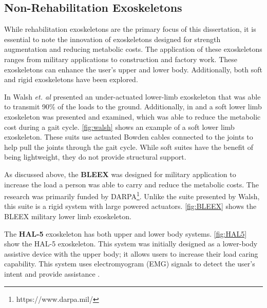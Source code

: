 \subsection{Non-Rehabilitation Exoskeletons}

While rehabilitation exoskeletons are the primary focus of this dissertation, it is essential to note the innovation of exoskeletons designed for strength augmentation and reducing metabolic costs. The application of these exoskeletons ranges from military applications to construction and factory work. These exoskeletons can enhance the user's upper and lower body. Additionally, both soft and rigid exoskeletons have been explored.

In \cite{walsh2006autonomous} Walsh \textit{et. al} presented an under-actuated lower-limb exoskeleton that was able to transmit 90\% of the loads to the ground. Additionally, in \cite{wehner2013lightweight} and \cite{asbeck2013biologically} a soft lower limb exoskeleton was presented and examined, which was able to reduce the metabolic cost during a gait cycle. \autoref{fig:walsh} shows an example of a soft lower limb exoskeleton. These suits use actuated Bowden cables connected to the joints to help pull the joints through the gait cycle. While soft suites have the benefit of being lightweight, they do not provide structural support.  



As discussed above, the \textbf{BLEEX} was designed for military application to increase the load a person was able to carry and reduce the metabolic costs. The research was primarily funded by DARPA\footnote{https://www.darpa.mil/}.  Unlike the suite presented by Walsh, this suite is a rigid system with large powered actuators. \autoref{fig:BLEEX} shows the BLEEX military lower limb exoskeleton.


The \textbf{HAL-5} exoskeleton has both upper and lower body systems. \autoref{fig:HAL5} show the HAL-5 exoskeleton. This system was initially designed as a lower-body assistive device with the upper body; it allows users to increase their load caring capability. This system uses electromyogram (EMG) signals to detect the user's intent and provide assistance \cite{casolo2008active}.



